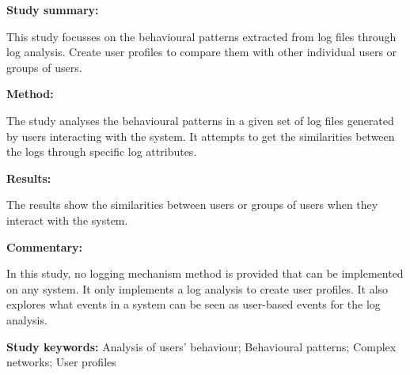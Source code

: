 \begin{tcolorbox}[colback=gray!5!white, colframe=pastelgreen!40!black, title=User behavioural patterns and reduced user profiles extracted from log files\cite{Slaninova2014}]
	\begin{minipage}[t]{0.25\textwidth}
		\textbf{Study summary:}
	\end{minipage}
	\hfill
	\begin{minipage}[t]{0.65\textwidth}
		This study focusses on the behavioural patterns extracted from log files through log
analysis. Create user profiles to compare them with other individual users or groups of users.
	\end{minipage}

	\vspace{0.75em} 

	\begin{minipage}[t]{0.25\textwidth}
		\textbf{Method:}
	\end{minipage}
	\hfill
	\begin{minipage}[t]{0.65\textwidth}
		The study analyses the behavioural patterns in a given set of log files generated by users interacting with the system. It attempts to get the similarities between the logs through specific log attributes.
	\end{minipage}

	\vspace{0.75em} 

	\begin{minipage}[t]{0.25\textwidth}
		\textbf{Results:}
	\end{minipage}
	\hfill
	\begin{minipage}[t]{0.65\textwidth}
		The results show the similarities between users or groups of users when they interact with the system.	
	\end{minipage}

	\vspace{0.75em} 

	\begin{minipage}[t]{0.25\textwidth}
		\textbf{Commentary:}
	\end{minipage}
	\hfill
	\begin{minipage}[t]{0.65\textwidth}
		In this study, no logging mechanism method is provided that can be implemented on any
		system. It only implements a log analysis to create user profiles. It also explores what
events in a system can be seen as user-based events for the log analysis.
	\end{minipage}
	\tcblower
	\textbf{Study keywords:} Analysis of users' behaviour; Behavioural patterns; Complex networks;
User profiles
\end{tcolorbox}

